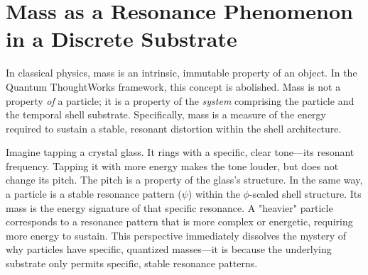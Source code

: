 \documentclass[12pt]{report}
\begin{document}
\section{Mass as a Resonance Phenomenon in a Discrete Substrate}
In classical physics, mass is an intrinsic, immutable property of an object. In the Quantum ThoughtWorks framework, this concept is abolished. Mass is not a property \textit{of} a particle; it is a property of the \textit{system} comprising the particle and the temporal shell substrate. Specifically, mass is a measure of the energy required to sustain a stable, resonant distortion within the shell architecture.

Imagine tapping a crystal glass. It rings with a specific, clear tone—its resonant frequency. Tapping it with more energy makes the tone louder, but does not change its pitch. The pitch is a property of the glass's structure. In the same way, a particle is a stable resonance pattern ($\psi$) within the $\phi$-scaled shell structure. Its mass is the energy signature of that specific resonance. A "heavier" particle corresponds to a resonance pattern that is more complex or energetic, requiring more energy to sustain. This perspective immediately dissolves the mystery of why particles have specific, quantized masses—it is because the underlying substrate only permits specific, stable resonance patterns.
\end{document}
